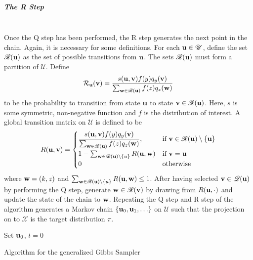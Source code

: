 \subparagraph{The R Step}~\\
\noindent
Once the Q step has been performed, the R step generates the next point in the chain. Again, it is necessary for some definitions.
For each $\mathbf{u} \in \mathscr U$, define the set $\mathscr R(\mathbf{u})$ as the set of possible transitions from $\mathbf{u}$. The sets $\mathscr R(\mathbf{u})$ must form a partition of ${\mathscr U}$. 
Define $$\mathcal R_{\mathbf{u}}(\mathbf{v}) = \frac{s(\mathbf{u},\mathbf{v})f(y)q_y(\mathbf{v})}{\sum_{\mathbf{w}\in\mathscr R(\mathbf{u})}f(z)q_z(\mathbf{w})}$$ to be the probability to transition from state $\mathbf{u}$ to state $\mathbf{v}\in\mathscr R(\mathbf{u})$. Here, $s$ is some symmetric, non-negative function and $f$ is the distribution of interest. %
A global transition matrix on ${\mathscr U}$ is defined to be
\begin{equation}
		R(\mathbf{u},\mathbf{v}) = 
			\begin{cases}
			\dfrac{s(\mathbf{u},\mathbf{v})f(y)q_y(\mathbf{v})}{\sum_{\mathbf{w}\in\mathscr R(\mathbf{u})}f(z)q_z(\mathbf{w})}, & \text{if } \mathbf{v} \in \mathscr R(\mathbf{u})\setminus\{\mathbf{u}\}\\
			1 - \sum_{\mathbf{w} \in \mathscr R(\mathbf{u})\setminus\mathbf{\{}u\}} R(\mathbf{u},\mathbf{w}) & 
		    \text{if $\mathbf{v} = \mathbf{u}$}\\
			0 & \text{otherwise}\end{cases}
		\end{equation}
	where $\mathbf{w} = (k,z)$ and $\sum_{\mathbf{w} \in \mathscr R(\mathbf{u})\setminus\mathbf{\{}u\}} R(\mathbf{u},\mathbf{w}) \leq 1$.
After having selected $\mathbf{v} \in \mathscr Q(\mathbf{u})$ by performing the Q step, generate $\mathbf{w} \in \mathscr R(\mathbf{v})$ by drawing from $R(\mathbf{u},\cdot)$ and update the state of the chain to $\mathbf{w}$.
Repeating the Q step and R step of the algorithm generates a Markov chain $\{\mathbf{u}_0,\mathbf{u}_1,\ldots\}$ on $\mathscr U$ such that the projection on to $\mathscr X$ is the target distribution $\pi$.

\begin{algorithm}[H]
 Set $\mathbf{u}_0$, $t=0$\; 
  \caption{Algorithm for the generalized Gibbs Sampler}
\end{algorithm}
